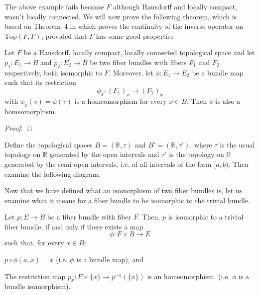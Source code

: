 The above example fails because $F$ although Hausdorff and locally compact, wasn't locally connected. We will now prove the following theorem, which is based on Theorem~4 in \cite{top_group} which proves the continuity of the inverse operator on $\mathrm{Top}(F,F)$, provided that $F$ has some good properties

\begin{theorem} Let $F$ be a Hausdorff, locally compact, locally connected topological space and let $p_1: E_1\to B$ and $p_2: E_2\to B$ be two fiber bundles with fibers $F_1$ and $F_2$ respectively, both isomorphic to $F$. Moreover, let $\phi:E_1\to E_2$ be a bundle map such that its restriction
\[\phi_x:(F_1)_x\to (F_2)_x\]
with $\phi_x(v)=\phi(v)$ is a homeomorphism for every $x\in B$. Then $\phi$ is also a homeomorphism.
\end{theorem}
\begin{proof}

\end{proof}





\begin{example} Define the topological spaces $B=(\mathbb{R}, \tau)$ and $B'=(\mathbb{R}, \tau')$, where $\tau$ is the usual topology on $\mathbb{R}$ generated by the open intervals and $\tau'$ is the topology on $\mathbb{R}$ generated by the semi-open intervals, i.e. of all intervals of the form $[a,b)$. Then examine the following diagram:
\begin{center}
\end{center}
\end{example}

Now that we have defined what an isomorphism of two fiber bundles is, let us examine what it means for a fiber bundle to be isomorphic to the trivial bundle.

\begin{remark}
Let $p:E\to B$ be a fiber bundle with fiber $F$. Then, $p$ is isomorphic to a trivial fiber bundle, if and only if there exists a map
\[\phi:F\times B\to E\]
such that, for every $x\in B$:
\begin{i_enum}
\item $p\circ\phi(a,x)=x$ (i.e. $\phi$ is a bundle map), and
\item The restriction map $p_x:F\times\{x\}\to p^{-1}(\{x\})$ is an homeomorphism. (i.e. $\phi$ is a bundle isomorphism).
\end{i_enum}
\end{remark}








%
%
%
%
%
